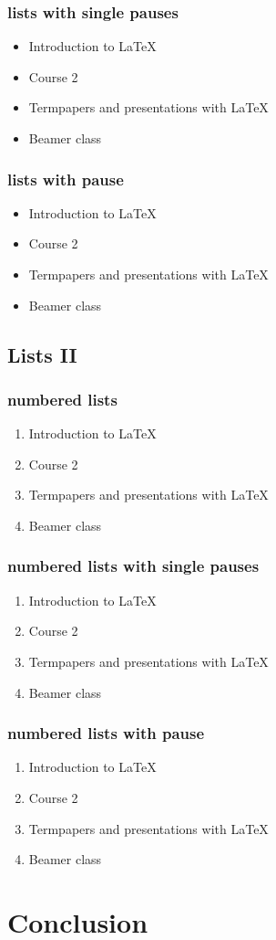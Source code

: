 \documentclass[hyperref={pdfpagelabels=false}]{beamer}
\begin{document}
\begin{frame}\frametitle{lists with single pauses}
	\begin{itemize}
		\item Introduction to  \LaTeX{}  \pause 
		\item Course 2 \pause 
		\item Termpapers and presentations with \LaTeX{}  \pause 
		\item Beamer class
	\end{itemize} 
\end{frame}

\begin{frame}\frametitle{lists with pause}
	\begin{itemize}[<+->]
		\item Introduction to  \LaTeX{}  
		\item Course 2
		\item Termpapers and presentations with \LaTeX{}  
		\item Beamer class
	\end{itemize} 
\end{frame}

\subsection{Lists II}

\begin{frame}\frametitle{numbered lists}
	\begin{enumerate}
		\item Introduction to  \LaTeX{}   
		\item Course 2 
		\item Termpapers and presentations with \LaTeX{}  
		\item Beamer class
	\end{enumerate}
\end{frame}

\begin{frame}
	\frametitle{numbered lists with single pauses}
	\begin{enumerate}
		\item Introduction to  \LaTeX{}  \pause 
		\item Course 2 \pause 
		\item Termpapers and presentations with \LaTeX{}  \pause 
		\item Beamer class
	\end{enumerate}
\end{frame}

\begin{frame}
	\frametitle{numbered lists with pause}
	\begin{enumerate}[<+->]
		\item Introduction to  \LaTeX{}  
		\item Course 2
		\item Termpapers and presentations with \LaTeX{}  
		\item Beamer class
	\end{enumerate}
\end{frame}


\section{Conclusion}
\end{document}

